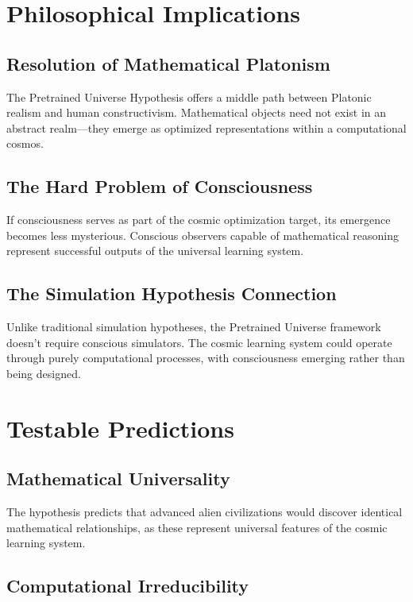 \documentclass[12pt]{article}
\begin{document}
\section{Philosophical Implications}

\subsection{Resolution of Mathematical Platonism}

The Pretrained Universe Hypothesis offers a middle path between Platonic realism and human constructivism. Mathematical objects need not exist in an abstract realm—they emerge as optimized representations within a computational cosmos.

\subsection{The Hard Problem of Consciousness}

If consciousness serves as part of the cosmic optimization target, its emergence becomes less mysterious. Conscious observers capable of mathematical reasoning represent successful outputs of the universal learning system.

\subsection{The Simulation Hypothesis Connection}

Unlike traditional simulation hypotheses, the Pretrained Universe framework doesn't require conscious simulators. The cosmic learning system could operate through purely computational processes, with consciousness emerging rather than being designed.

\section{Testable Predictions}

\subsection{Mathematical Universality}

The hypothesis predicts that advanced alien civilizations would discover identical mathematical relationships, as these represent universal features of the cosmic learning system.

\subsection{Computational Irreducibility}
\end{document}
